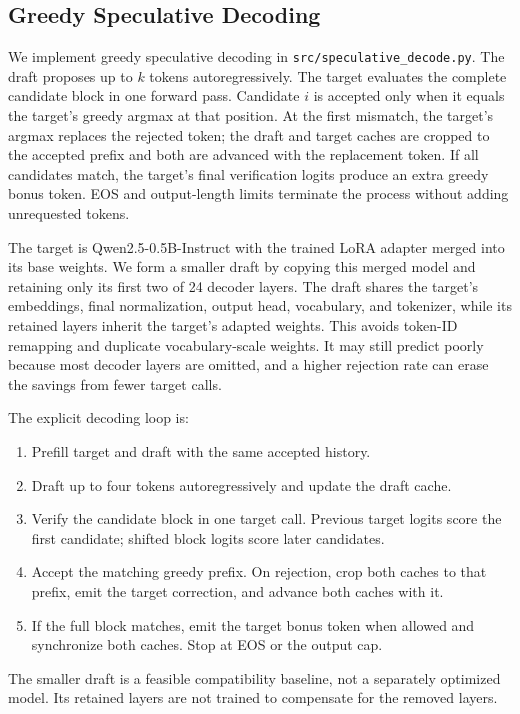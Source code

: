 \documentclass[conference]{IEEEtran}
\begin{document}
\subsection{Greedy Speculative Decoding}


We implement greedy speculative decoding in \texttt{src/speculative\_decode.py}. The draft proposes up to $k$ tokens autoregressively. The target evaluates the complete candidate block in one forward pass. Candidate $i$ is accepted only when it equals the target's greedy argmax at that position. At the first mismatch, the target's argmax replaces the rejected token; the draft and target caches are cropped to the accepted prefix and both are advanced with the replacement token. If all candidates match, the target's final verification logits produce an extra greedy bonus token. EOS and output-length limits terminate the process without adding unrequested tokens.

The target is Qwen2.5-0.5B-Instruct with the trained LoRA adapter merged into its base weights. We form a smaller draft by copying this merged model and retaining only its first two of 24 decoder layers. The draft shares the target's embeddings, final normalization, output head, vocabulary, and tokenizer, while its retained layers inherit the target's adapted weights. This avoids token-ID remapping and duplicate vocabulary-scale weights. It may still predict poorly because most decoder layers are omitted, and a higher rejection rate can erase the savings from fewer target calls.


The explicit decoding loop is:
\begin{enumerate}
\item Prefill target and draft with the same accepted history.
\item Draft up to four tokens autoregressively and update the draft cache.
\item Verify the candidate block in one target call. Previous target logits score the first candidate; shifted block logits score later candidates.
\item Accept the matching greedy prefix. On rejection, crop both caches to that prefix, emit the target correction, and advance both caches with it.
\item If the full block matches, emit the target bonus token when allowed and synchronize both caches. Stop at EOS or the output cap.
\end{enumerate}
The smaller draft is a feasible compatibility baseline, not a separately optimized model. Its retained layers are not trained to compensate for the removed layers.
\end{document}
